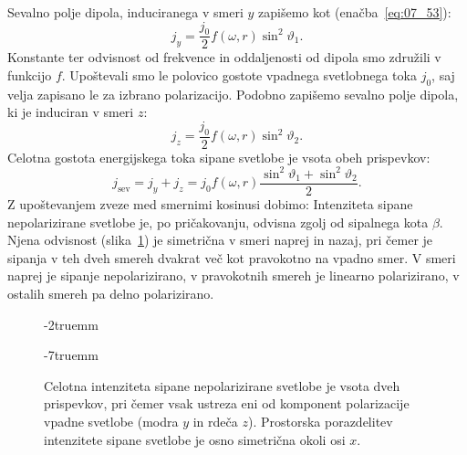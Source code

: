 Sevalno polje dipola, induciranega v smeri $y$ 
zapišemo kot (enačba~\ref{eq:07_53}):
\begin{equation}
j_y = \frac{j_0}{2} f(\omega, r) \sin^2 \vartheta_1.
\label{eq:07_58}
\end{equation}
Konstante ter odvisnost od frekvence in oddaljenosti od dipola smo združili 
v funkcijo $f$. Upoštevali smo le polovico gostote vpadnega svetlobnega toka $j_0$, saj 
velja zapisano le za izbrano polarizacijo. Podobno zapišemo sevalno polje dipola, ki je 
induciran v smeri $z$:
\begin{equation}
j_z = \frac{j_0}{2} f(\omega, r) \sin^2 \vartheta_2.
\label{eq:07_59}
\end{equation}
Celotna gostota energijskega toka sipane svetlobe je vsota obeh prispevkov:
\begin{equation}
j_\mathrm{sev} = j_y + j_z = j_0 f(\omega, r) \frac{\sin^2 \vartheta_1 + \sin^2 \vartheta_2}{2}.
\label{eq:07_60}
\end{equation}
Z upoštevanjem zveze med smernimi kosinusi dobimo:
Intenziteta sipane nepolarizirane svetlobe je, po pričakovanju, odvisna zgolj od sipalnega kota $\beta$.
Njena odvisnost (slika~\ref{fig:07_nepol}) je simetrična v smeri naprej in nazaj, pri čemer je 
sipanja v teh dveh smereh dvakrat več kot pravokotno na vpadno smer. V smeri naprej je sipanje 
nepolarizirano, v pravokotnih smereh je linearno polarizirano, v ostalih smereh pa delno polarizirano.
\begin{figure}[!ht]
\vglue-2truemm
\centering
\def\svgwidth{70truemm} 

\caption{Celotna intenziteta sipane nepolarizirane svetlobe je vsota dveh prispevkov, pri čemer vsak
ustreza eni od komponent polarizacije vpadne svetlobe (modra $y$ in rdeča $z$). Prostorska porazdelitev
intenzitete sipane svetlobe je osno simetrična okoli osi $x$.}
\label{fig:07_nepol}
\vglue-7truemm
\end{figure}


